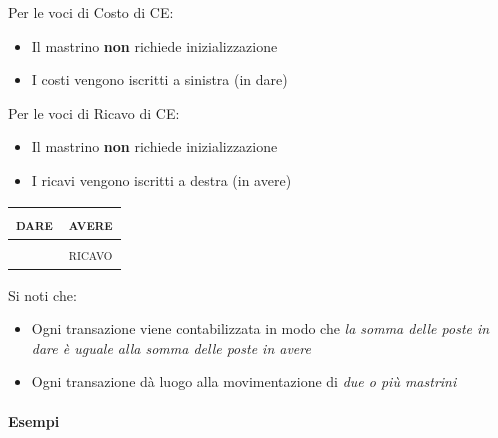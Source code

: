 Per le voci di Costo di CE:
\begin{itemize}
    \item Il mastrino \textbf{non} richiede inizializzazione
    \item I costi vengono iscritti a sinistra (in dare)
\end{itemize}



Per le voci di Ricavo di CE:
\begin{itemize}
    \item Il mastrino \textbf{non} richiede inizializzazione
    \item I ricavi vengono iscritti a destra (in avere)
\end{itemize}

\vspace{1em}
\begin{tabular}{c|c}
    \textsc{dare} & \textsc{avere} \\
    \hline
    \quad & \textsc{ricavo}\\
\end{tabular}
\vspace{1em}

Si noti che:
\begin{itemize}
    \item Ogni transazione viene contabilizzata in modo che \emph{la somma delle
    poste in dare è uguale alla somma delle poste in avere}
    \item Ogni transazione dà luogo alla movimentazione di \emph{due o più mastrini}
\end{itemize}

\paragraph{Esempi}
\newcommand{\mastrino}[2]{
    \begin{tabular}{p{3cm}|p{3cm}}
        \multicolumn{2}{c}{#1}\tabularnewline
        \hline
        #2
    \end{tabular}
}

